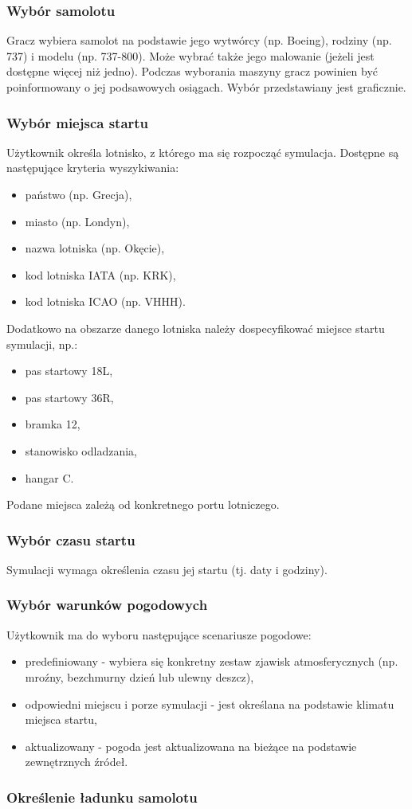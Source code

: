 \documentclass{mwrep}
\begin{document}
\subsubsection{Wybór samolotu}
Gracz wybiera samolot na podstawie jego wytwórcy (np. Boeing), rodziny (np. 737) i modelu (np. 737-800). Może wybrać także jego malowanie (jeżeli jest dostępne więcej niż jedno). Podczas wyborania maszyny gracz powinien być poinformowany o jej podsawowych osiągach. Wybór przedstawiany jest graficznie.

\subsubsection{Wybór miejsca startu}
Użytkownik określa lotnisko, z którego ma się rozpocząć symulacja. Dostępne są następujące kryteria wyszykiwania:
\begin{itemize}
\item państwo (np. Grecja),
\item miasto (np. Londyn),
\item nazwa lotniska (np. Okęcie),
\item kod lotniska IATA (np. KRK),
\item kod lotniska ICAO (np. VHHH).
\end{itemize}
Dodatkowo na obszarze danego lotniska należy dospecyfikować miejsce startu symulacji, np.:
\begin{itemize}
\item pas startowy 18L,
\item pas startowy 36R,
\item bramka 12,
\item stanowisko odladzania,
\item hangar C.
\end{itemize}
Podane miejsca zależą od konkretnego portu lotniczego.

\subsubsection{Wybór czasu startu}
Symulacji wymaga określenia czasu jej startu (tj. daty i godziny).

\subsubsection{Wybór warunków pogodowych}
Użytkownik ma do wyboru następujące scenariusze pogodowe:
\begin{itemize}
\item predefiniowany - wybiera się konkretny zestaw zjawisk atmosferycznych (np. mroźny, bezchmurny dzień lub ulewny deszcz),
\item odpowiedni miejscu i porze symulacji - jest określana na podstawie klimatu miejsca startu,
\item aktualizowany - pogoda jest aktualizowana na bieżące na podstawie zewnętrznych źródeł.
\end{itemize}

\subsubsection{Określenie ładunku samolotu}
\end{document}
